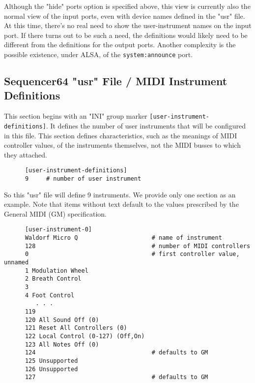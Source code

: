    Although the "hide" ports option is specified above, this view is
   currently also the normal view of the input ports, even with device names
   defined in the "usr" file.
   At this time, there's no real need to show the user-instrument names
   on the input port.  If there turns out to be such a need, the definitions
   would likely need to be different from the definitions for the output ports.
   Another complexity is the possible existence, under ALSA, of the
   \texttt{system:announce} port.

\subsection{Sequencer64 "usr" File / MIDI Instrument Definitions}
\label{subsec:seq64_usr_file_midi_instrument_definitions}

   This section begins with an
   "INI" group marker \texttt{[user-instrument-definitions]}.
   It defines the number of user instruments that will be configured in this
   file.  This section defines characteristics, such as
   the meanings of MIDI controller values, of the instruments themselves,
   not the MIDI busses to which they attached.

   \begin{verbatim}
      [user-instrument-definitions]
      9     # number of user instrument
   \end{verbatim}

   So this "usr" file will define 9 instruments.  We provide only one section
   as an example.  Note that items without text default to the values
   prescribed by the General MIDI (GM) specification.

   \begin{verbatim}
      [user-instrument-0]
      Waldorf Micro Q                     # name of instrument
      128                                 # number of MIDI controllers
      0                                   # first controller value, unnamed
      1 Modulation Wheel
      2 Breath Control
      3 
      4 Foot Control
         . . .
      119
      120 All Sound Off (0)
      121 Reset All Controllers (0)
      122 Local Control (0-127) (Off,On)
      123 All Notes Off (0)
      124                                 # defaults to GM
      125 Unsupported
      126 Unsupported
      127                                 # defaults to GM
   \end{verbatim}

